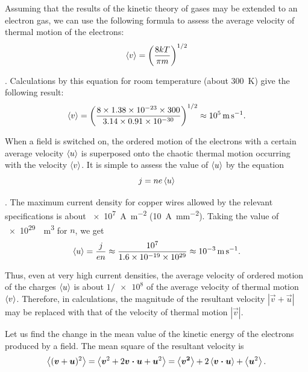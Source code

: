 Assuming that the results of the kinetic theory of gases may be extended to an electron gas, we can use the following formula to assess the average velocity of thermal motion of the electrons:
\begin{equation}\label{eq:11_3}
    \left\langle v \right\rangle = \left(\frac{8kT}{\pi m}\right)^{1/2}
\end{equation}

.
Calculations by this equation for room temperature (about \SI{300}{\kelvin}) give the following result:
\begin{equation*}
    \left\langle v \right\rangle = \left(\frac{8 \times \num{1.38e-23} \times 300}{ 3.14 \times \num{0.91e-30} }\right)^{1/2} \approx \SI{e5}{\metre\per\second}.
\end{equation*}

When a field is switched on, the ordered motion of the electrons with a certain average velocity $\left\langle u \right\rangle$ is superposed onto the chaotic thermal motion occurring with the velocity $\left\langle v \right\rangle$.
It is simple to assess the value of $\left\langle u \right\rangle$ by the equation
\begin{equation}\label{eq:11_4}
    j = ne\left\langle u \right\rangle
\end{equation}

.
The maximum current density for copper wires allowed by the relevant specifications is about \SI{e7}{\ampere\per\metre\squared} (\SI{10}{\ampere\per\milli\metre\squared}).
Taking the value of \SI{e29}{\per\metre\cubed} for $n$, we get
\begin{equation*}
    \left\langle u \right\rangle = \frac{j}{en} \approx \frac{\num{e7}}{\num{1.6e-19} \times \num{e29}} \approx \SI{e-3}{\metre\per\second}.
\end{equation*}

\noindent
Thus, even at very high current densities, the average velocity of ordered motion of the charges $\left\langle u \right\rangle$ is about $1/\num{e8}$ of the average velocity of thermal motion $\left\langle v \right\rangle$.
Therefore, in calculations, the magnitude of the resultant velocity $|\vec{v}+\vec{u}|$ may be replaced with that of the velocity of thermal motion $|\vec{v}|$.

Let us find the change in the mean value of the kinetic energy of the electrons produced by a field.
The mean square of the resultant velocity is
\begin{equation}\label{eq:11_5}
    \left\langle (\boldsymbol{v}+\boldsymbol{u})^2 \right\rangle = \left\langle \boldsymbol{v}^2 + 2\boldsymbol{v\cdot u} + \boldsymbol{u}^2 \right\rangle = \left\langle \boldsymbol{v^2} \right\rangle + 2 \left\langle \boldsymbol{v\cdot u} \right\rangle + \left\langle \boldsymbol{u}^2 \right\rangle.
\end{equation}

